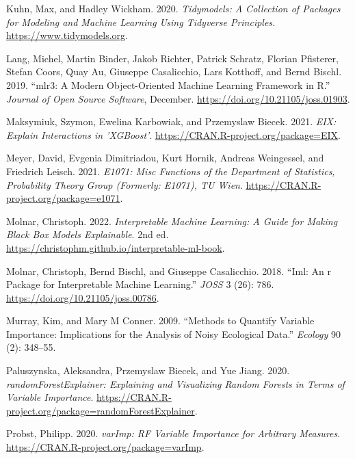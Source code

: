 \begin{CSLReferences}{1}{0}
\leavevmode{}%
Kuhn, Max, and Hadley Wickham. 2020. \emph{Tidymodels: A Collection of Packages for Modeling and Machine Learning Using Tidyverse Principles.} \url{https://www.tidymodels.org}.

\leavevmode{}%
Lang, Michel, Martin Binder, Jakob Richter, Patrick Schratz, Florian Pfisterer, Stefan Coors, Quay Au, Giuseppe Casalicchio, Lars Kotthoff, and Bernd Bischl. 2019. {``{mlr3}: A Modern Object-Oriented Machine Learning Framework in {R}.''} \emph{Journal of Open Source Software}, December. \url{https://doi.org/10.21105/joss.01903}.

\leavevmode{}%
Maksymiuk, Szymon, Ewelina Karbowiak, and Przemyslaw Biecek. 2021. \emph{EIX: Explain Interactions in 'XGBoost'}. \url{https://CRAN.R-project.org/package=EIX}.

\leavevmode{}%
Meyer, David, Evgenia Dimitriadou, Kurt Hornik, Andreas Weingessel, and Friedrich Leisch. 2021. \emph{E1071: Misc Functions of the Department of Statistics, Probability Theory Group (Formerly: E1071), TU Wien}. \url{https://CRAN.R-project.org/package=e1071}.

\leavevmode{}%
Molnar, Christoph. 2022. \emph{Interpretable Machine Learning: A Guide for Making Black Box Models Explainable}. 2nd ed. \url{https://christophm.github.io/interpretable-ml-book}.

\leavevmode{}%
Molnar, Christoph, Bernd Bischl, and Giuseppe Casalicchio. 2018. {``Iml: An r Package for Interpretable Machine Learning.''} \emph{JOSS} 3 (26): 786. \url{https://doi.org/10.21105/joss.00786}.

\leavevmode{}%
Murray, Kim, and Mary M Conner. 2009. {``Methods to Quantify Variable Importance: Implications for the Analysis of Noisy Ecological Data.''} \emph{Ecology} 90 (2): 348--55.

\leavevmode{}%
Paluszynska, Aleksandra, Przemyslaw Biecek, and Yue Jiang. 2020. \emph{randomForestExplainer: Explaining and Visualizing Random Forests in Terms of Variable Importance}. \url{https://CRAN.R-project.org/package=randomForestExplainer}.

\leavevmode{}%
Probst, Philipp. 2020. \emph{varImp: {RF} {V}ariable {I}mportance for {A}rbitrary {M}easures}. \url{https://CRAN.R-project.org/package=varImp}.


\end{CSLReferences}
